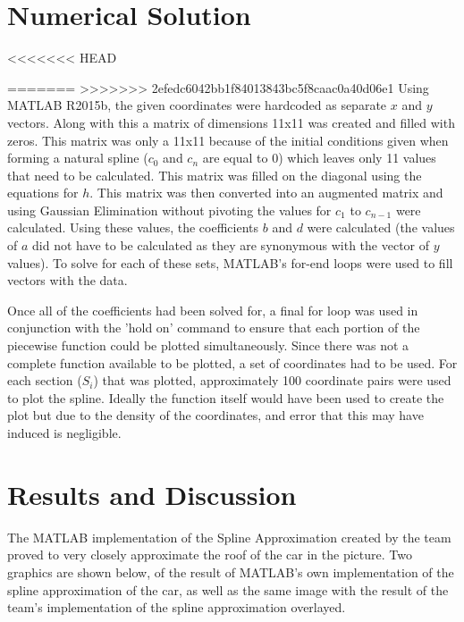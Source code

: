\documentclass[12pt, letterpaper]{article} %
\begin{document}
\section{Numerical Solution}
<<<<<<< HEAD

=======
>>>>>>> 2efedc6042bb1f84013843bc5f8caac0a40d06e1
Using MATLAB R2015b, the given coordinates were hardcoded as separate $x$ and $y$ vectors. Along with this a matrix of dimensions 11x11 was created and filled with zeros. This matrix was only a 11x11 because of the initial conditions given when forming a natural spline ($c_0$ and $c_n$ are equal to 0) which leaves only 11 values that need to be calculated. This matrix was filled on the diagonal using the equations for $h$. This matrix was then converted into an augmented matrix and using Gaussian Elimination without pivoting the values for $c_1$ to $c_{n-1}$ were calculated. Using these values, the coefficients $b$ and $d$ were calculated (the values of $a$ did not have to be calculated as they are synonymous with the vector of $y$ values). To solve for each of these sets, MATLAB's for-end loops were used to fill vectors with the data. 

Once all of the coefficients had been solved for, a final for loop was used in conjunction with the 'hold on' command to ensure that each portion of the piecewise function could be plotted simultaneously. Since there was not a complete function available to be plotted, a set of coordinates had to be used. For each section ($S_i$) that was plotted, approximately 100 coordinate pairs were used to plot the spline. Ideally the function itself would have been used to create the plot but due to the density of the coordinates, and error that this may have induced is negligible. 

\section{Results and Discussion}
The MATLAB implementation of the Spline Approximation created by the team proved to very closely approximate the roof of the car in the picture. Two graphics are shown below, of the result of MATLAB's own implementation of the spline approximation of the car, as well as the same image with the result of the team's implementation of the spline approximation overlayed.
\end{document}
